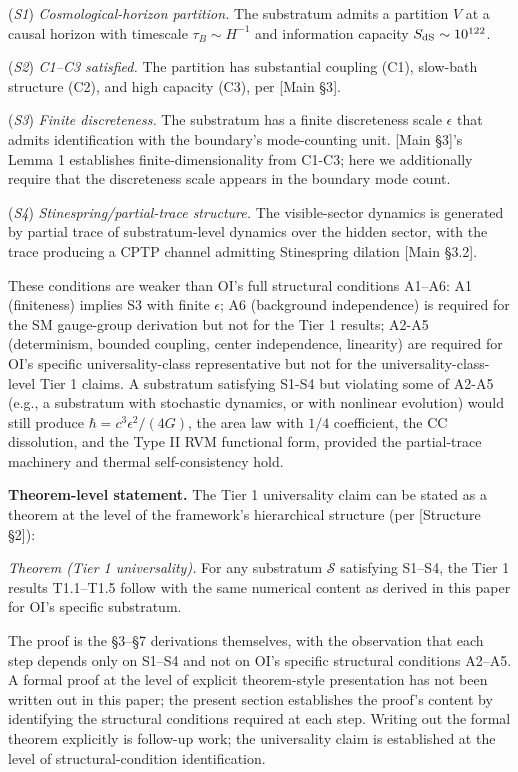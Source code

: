 \documentclass[
]{article}
\begin{document}
(\emph{S1}) \emph{Cosmological-horizon partition.} The substratum admits
a partition \(V\) at a causal horizon with timescale
\(\tau_B \sim H^{-1}\) and information capacity
\(S_{\rm dS} \sim 10^{122}\).

(\emph{S2}) \emph{C1--C3 satisfied.} The partition has substantial
coupling (C1), slow-bath structure (C2), and high capacity (C3), per
{[}Main §3{]}.

(\emph{S3}) \emph{Finite discreteness.} The substratum has a finite
discreteness scale \(\epsilon\) that admits identification with the
boundary's mode-counting unit. {[}Main §3{]}'s Lemma 1 establishes
finite-dimensionality from C1-C3; here we additionally require that the
discreteness scale appears in the boundary mode count.

(\emph{S4}) \emph{Stinespring/partial-trace structure.} The
visible-sector dynamics is generated by partial trace of
substratum-level dynamics over the hidden sector, with the trace
producing a CPTP channel admitting Stinespring dilation {[}Main §3.2{]}.

These conditions are weaker than OI's full structural conditions A1--A6:
A1 (finiteness) implies S3 with finite \(\epsilon\); A6 (background
independence) is required for the SM gauge-group derivation but not for
the Tier 1 results; A2-A5 (determinism, bounded coupling, center
independence, linearity) are required for OI's specific
universality-class representative but not for the
universality-class-level Tier 1 claims. A substratum satisfying S1-S4
but violating some of A2-A5 (e.g., a substratum with stochastic
dynamics, or with nonlinear evolution) would still produce
\(\hbar = c^3 \epsilon^2/(4G)\), the area law with \(1/4\) coefficient,
the CC dissolution, and the Type II RVM functional form, provided the
partial-trace machinery and thermal self-consistency hold.

\textbf{Theorem-level statement.} The Tier 1 universality claim can be
stated as a theorem at the level of the framework's hierarchical
structure (per {[}Structure §2{]}):

\emph{Theorem (Tier 1 universality).} For any substratum \(\mathcal{S}\)
satisfying S1--S4, the Tier 1 results T1.1--T1.5 follow with the same
numerical content as derived in this paper for OI's specific substratum.

The proof is the §3--§7 derivations themselves, with the observation
that each step depends only on S1--S4 and not on OI's specific
structural conditions A2--A5. A formal proof at the level of explicit
theorem-style presentation has not been written out in this paper; the
present section establishes the proof's content by identifying the
structural conditions required at each step. Writing out the formal
theorem explicitly is follow-up work; the universality claim is
established at the level of structural-condition identification.
\end{document}
